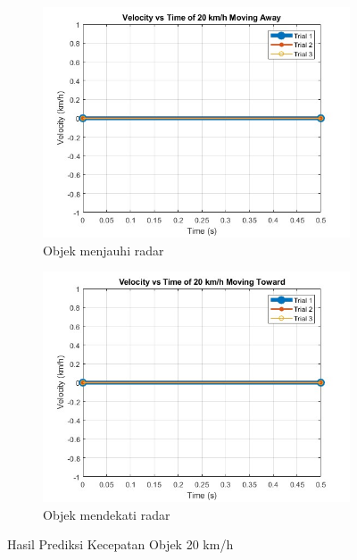 \begin{figure}
    \centering
    \begin{subfigure}[b]{0.45\textwidth}
        \centering
		\includegraphics[scale=0.4]{pics/bab5/Velocity/20MA.jpg}
		\caption{Objek menjauhi radar}
		\label{fig:pengambilan20MA}
    \end{subfigure}
    \hfill
    \begin{subfigure}[b]{0.45\textwidth}
        \centering
		\includegraphics[scale=0.4]{pics/bab5/Velocity/20MT.jpg}
		\caption{Objek mendekati radar}
		\label{fig:pengambilan20MT}
    \end{subfigure}
    \caption{Hasil Prediksi Kecepatan Objek 20 km/h}
    \label{fig:pengambilan20}
\end{figure}

